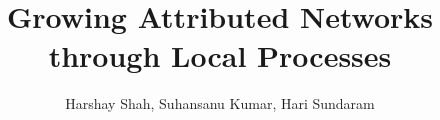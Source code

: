 \documentclass[sigconf]{acmart}
\begin{document}
\title{Growing Attributed Networks through Local Processes}

\author{Harshay Shah, Suhansanu Kumar, Hari Sundaram}

\renewcommand{\shortauthors}{Shah et al.}

\begin{abstract}

\end{abstract}


\maketitle

















\clearpage



\end{document}
